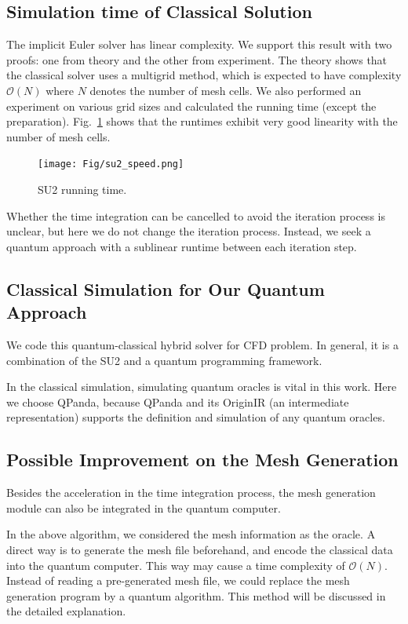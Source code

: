 \documentclass[%
 reprint,
 amsmath,amssymb,
pra,
]{revtex4-1}
\begin{document}
\subsection{Simulation time of Classical Solution}

The implicit Euler solver has linear complexity. We support this result with two proofs: one from theory and the other from experiment. The theory shows that the classical solver uses a multigrid method, which is expected to have complexity $\mathcal{O}(N)$ where $N$ denotes the number of mesh cells. We also performed an experiment on various grid sizes and calculated the running time (except the preparation). Fig.~\ref{su2Speed} shows that the runtimes exhibit very good linearity with the number of mesh cells.

\begin{figure} 
\centering
\texttt{[image: Fig/su2\_speed.png]}
\caption{SU2 running time.} \label{su2Speed}
\end{figure}

Whether the time integration can be cancelled to avoid the iteration process is unclear, but here we do not change the iteration process. Instead, we seek a quantum approach with a sublinear runtime between each iteration step.

\subsection{Classical Simulation for Our Quantum Approach}
We code this quantum-classical hybrid solver for CFD problem. In general, it is a combination of the SU2 and a quantum programming framework.

In the classical simulation, simulating quantum oracles is vital in this work. Here we choose QPanda, because QPanda and its OriginIR (an intermediate representation) supports the definition and simulation of any quantum oracles. 

\subsection{Possible Improvement on the Mesh Generation}
Besides the acceleration in the time integration process, the mesh generation module can also be integrated in the quantum computer.

In the above algorithm, we considered the mesh information as the oracle. A direct way is to generate the mesh file beforehand, and encode the classical data into the quantum computer. This way may cause a time complexity of $\mathcal{O}(N)$. Instead of reading a pre-generated mesh file, we could replace the mesh generation program by a quantum algorithm. This method will be discussed in the detailed explanation.
\end{document}
